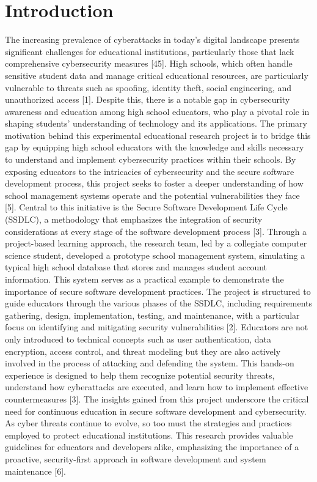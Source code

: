 \documentclass[letterpaper,twocolumn]{article}
\begin{document}
\section{Introduction} %
The increasing prevalence of cyberattacks in today's digital landscape presents significant challenges for educational institutions, particularly those that lack comprehensive cybersecurity measures [45]. High schools, which often handle sensitive student data and manage critical educational resources, are particularly vulnerable to threats such as spoofing, identity theft, social engineering, and unauthorized access [1]. Despite this, there is a notable gap in cybersecurity awareness and education among high school educators, who play a pivotal role in shaping students' understanding of technology and its applications.
The primary motivation behind this experimental educational research project is to bridge this gap by equipping high school educators with the knowledge and skills necessary to understand and implement cybersecurity practices within their schools. By exposing educators to the intricacies of cybersecurity and the secure software development process, this project seeks to foster a deeper understanding of how school management systems operate and the potential vulnerabilities they face [5].
Central to this initiative is the Secure Software Development Life Cycle (SSDLC), a methodology that emphasizes the integration of security considerations at every stage of the software development process [3]. Through a project-based learning approach, the research team, led by a collegiate computer science student, developed a prototype school management system, simulating a typical high school database that stores and manages student account information. This system serves as a practical example to demonstrate the importance of secure software development practices.
The project is structured to guide educators through the various phases of the SSDLC, including requirements gathering, design, implementation, testing, and maintenance, with a particular focus on identifying and mitigating security vulnerabilities [2]. Educators are not only introduced to technical concepts such as user authentication, data encryption, access control, and threat modeling but they are also actively involved in the process of attacking and defending the system. This hands-on experience is designed to help them recognize potential security threats, understand how cyberattacks are executed, and learn how to implement effective countermeasures [3].
The insights gained from this project underscore the critical need for continuous education in secure software development and cybersecurity. As cyber threats continue to evolve, so too must the strategies and practices employed to protect educational institutions. This research provides valuable guidelines for educators and developers alike, emphasizing the importance of a proactive, security-first approach in software development and system maintenance [6].
 \cite{1}
\end{document}
